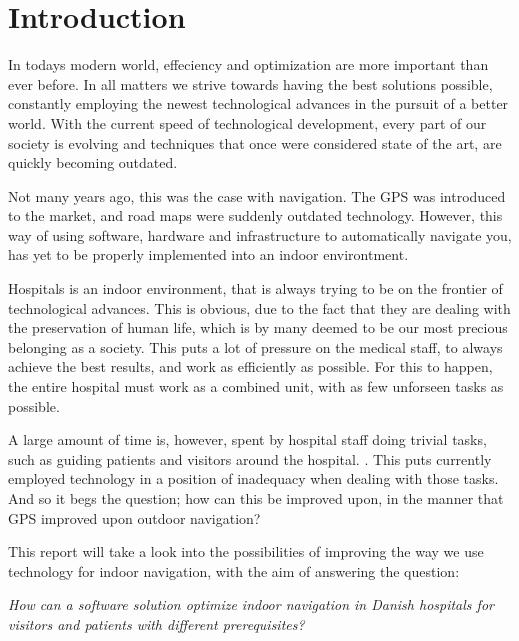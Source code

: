 \chapter{Introduction}\label{intro}

In todays modern world, effeciency and optimization are more important than ever before. In all matters we strive towards having the best solutions possible, constantly employing the newest technological advances in the pursuit of a better world. With the current speed of technological development, every part of our society is evolving and techniques that once were considered state of the art, are quickly becoming outdated.

Not many years ago, this was the case with navigation. The GPS was introduced to the market, and road maps were suddenly outdated technology. However, this way of using software, hardware and infrastructure to automatically navigate you, has yet to be properly implemented into an indoor environtment.

Hospitals is an indoor environment, that is always trying to be on the frontier of technological advances. This is obvious, due to the fact that they are dealing with the preservation of human life, which is by many deemed to be our most precious belonging as a society. This puts a lot of pressure on the medical staff, to always achieve the best results, and work as efficiently as possible. For this to happen, the entire hospital must work as a combined unit, with as few unforseen tasks as possible.

A large amount of time is, however, spent by hospital staff doing trivial tasks, such as guiding patients and visitors around the hospital. \cite{findvejintro} \cite{timewaste}. This puts currently employed technology in a position of inadequacy when dealing with those tasks. And so it begs the question; how can this be improved upon, in the manner that GPS improved upon outdoor navigation?

This report will take a look into the possibilities of improving the way we use technology for indoor navigation, with the aim of answering the question:

\textit{How can a software solution optimize indoor navigation in Danish hospitals for visitors and patients with different prerequisites?}\label{sub:init}



